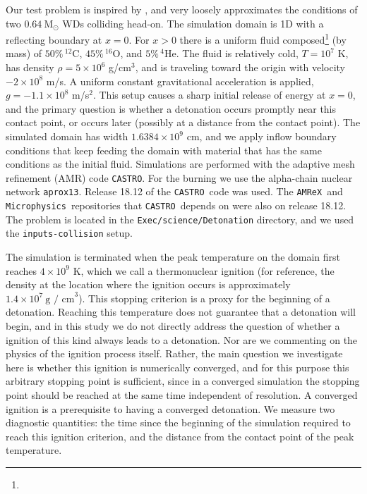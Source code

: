 \documentclass[twocolumn,numberedappendix,trackchanges]{aastex62}
\newcommand{\msolar}{\mathrm{M}_\odot}
\newcommand{\amrex}{\texttt{AMReX}}
\newcommand{\castro}{\texttt{CASTRO}}
\newcommand{\microphysics}{\texttt{Microphysics}}
\begin{document}
Our test problem is inspired by \cite{kushnir:2013}, and very loosely approximates the
conditions of two $0.64\ \msolar$ WDs colliding head-on. The simulation domain is 1D with a
reflecting boundary at $x = 0$. For $x > 0$ there is a uniform fluid composed\footnote{
} (by mass)
of $50\%\, ^{12}$C, $45\%\, ^{16}$O, and $5\%\, ^{4}$He. The fluid is relatively cold,
$T = 10^7$ K, has density $\rho = 5 \times 10^6$ g/cm$^3$, and is traveling toward the
origin with velocity $-2 \times 10^8$ m/s. A uniform constant gravitational acceleration
is applied, $g = -1.1 \times 10^8$ m/s$^{2}$. This setup causes a sharp initial release
of energy at $x = 0$, and the primary question is whether a detonation occurs promptly
near this contact point, or occurs later (possibly at a distance from the contact point).
The simulated domain has width $1.6384 \times 10^9$ cm, and we apply inflow boundary conditions
that keep feeding the domain with material that has the same conditions as the initial fluid.
Simulations are performed with the adaptive mesh refinement (AMR) code \castro.
For the burning we use the alpha-chain nuclear network \texttt{aprox13}.
Release 18.12 of the \castro\ code was used. The \amrex\ and \microphysics\ repositories
that \castro\ depends on were also on release 18.12. The problem is located in the
\texttt{Exec/science/Detonation} directory, and we used the \texttt{inputs-collision} setup.

The simulation is terminated when the peak temperature on the domain first reaches
$4 \times 10^9$ K, which we call a thermonuclear ignition (for reference, the
density at the location where the ignition occurs is approximately $1.4\times 10^7\ \text{g / cm}^3$). This stopping criterion is a
proxy for the beginning of a detonation. Reaching this temperature does not guarantee
that a detonation will begin, and in this study we do not directly address the question
of whether a ignition of this kind always leads to a detonation. Nor are we commenting
on the physics of the ignition process itself. Rather, the main question
we investigate here is whether this ignition is numerically converged, and for this purpose
this arbitrary stopping point is sufficient, since in a converged simulation the stopping point
should be reached at the same time independent of resolution. A converged ignition
is a prerequisite to having a converged detonation. We measure two diagnostic quantities:
the time since the beginning of the simulation required to reach this ignition criterion,
and the distance from the contact point of the peak temperature.
\end{document}
